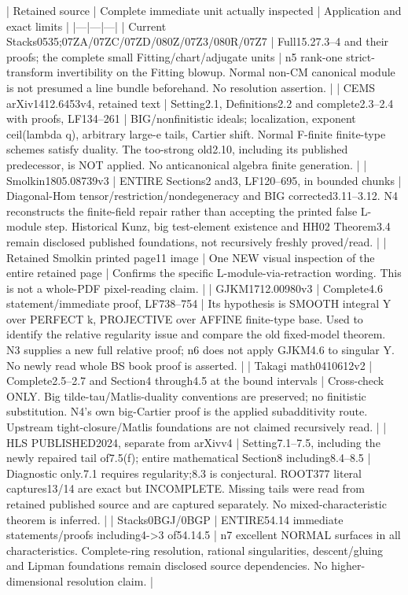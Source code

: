 \documentclass[11pt]{article}
\begin{document}
\begin{OwnProofBody}
| Retained source | Complete immediate unit actually inspected | Application and exact limits |
|---|---|---|
| Current Stacks0535;07ZA/07ZC/07ZD/080Z/07Z3/080R/07Z7 | Full15.27.3--4 and their proofs; the complete small Fitting/chart/adjugate units | n5 rank-one strict-transform invertibility on the Fitting blowup. Normal non-CM canonical module is not presumed a line bundle beforehand. No resolution assertion. |
| CEMS arXiv1412.6453v4, retained text | Setting2.1, Definitions2.2 and complete2.3--2.4 with proofs, LF134--261 | BIG/nonfinitistic ideals; localization, exponent ceil(lambda q), arbitrary large-e tails, Cartier shift. Normal F-finite finite-type schemes satisfy duality. The too-strong old2.10, including its published predecessor, is NOT applied. No anticanonical algebra finite generation. |
| Smolkin1805.08739v3 | ENTIRE Sections2 and3, LF120--695, in bounded chunks | Diagonal-Hom tensor/restriction/nondegeneracy and BIG corrected3.11--3.12. N4 reconstructs the finite-field repair rather than accepting the printed false L-module step. Historical Kunz, big test-element existence and HH02 Theorem3.4 remain disclosed published foundations, not recursively freshly proved/read. |
| Retained Smolkin printed page11 image | One NEW visual inspection of the entire retained page | Confirms the specific L-module-via-retraction wording. This is not a whole-PDF pixel-reading claim. |
| GJKM1712.00980v3 | Complete4.6 statement/immediate proof, LF738--754 | Its hypothesis is SMOOTH integral Y over PERFECT k, PROJECTIVE over AFFINE finite-type base. Used to identify the relative regularity issue and compare the old fixed-model theorem. N3 supplies a new full relative proof; n6 does not apply GJKM4.6 to singular Y. No newly read whole BS book proof is asserted. |
| Takagi math0410612v2 | Complete2.5--2.7 and Section4 through4.5 at the bound intervals | Cross-check ONLY. Big tilde-tau/Matlis-duality conventions are preserved; no finitistic substitution. N4's own big-Cartier proof is the applied subadditivity route. Upstream tight-closure/Matlis foundations are not claimed recursively read. |
| HLS PUBLISHED2024, separate from arXivv4 | Setting7.1--7.5, including the newly repaired tail of7.5(f); entire mathematical Section8 including8.4--8.5 | Diagnostic only.7.1 requires regularity;8.3 is conjectural. ROOT377 literal captures13/14 are exact but INCOMPLETE. Missing tails were read from retained published source and are captured separately. No mixed-characteristic theorem is inferred. |
| Stacks0BGJ/0BGP | ENTIRE54.14 immediate statements/proofs including4->3 of54.14.5 | n7 excellent NORMAL surfaces in all characteristics. Complete-ring resolution, rational singularities, descent/gluing and Lipman foundations remain disclosed source dependencies. No higher-dimensional resolution claim. |

\end{OwnProofBody}
\end{document}
